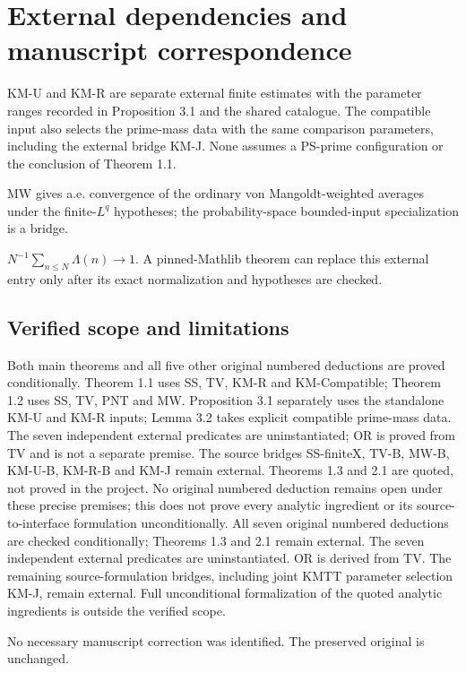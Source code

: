\section*{External dependencies and manuscript correspondence}
\begin{inputthm}\label{input:KM}
KM-U and KM-R are separate external finite estimates with the parameter ranges recorded in Proposition 3.1 and the shared catalogue. The compatible input also selects the prime-mass data with the same comparison parameters, including the external bridge KM-J. None assumes a PS-prime configuration or the conclusion of Theorem 1.1.
\end{inputthm}
\begin{inputthm}\label{input:MW}
MW gives a.e. convergence of the ordinary von Mangoldt-weighted averages under the finite-$L^q$ hypotheses; the probability-space bounded-input specialization is a bridge.
\end{inputthm}
\begin{inputthm}\label{input:PNT}
$N^{-1}\sum_{n\leq N}\Lambda(n)\to1$. A pinned-Mathlib theorem can replace this external entry only after its exact normalization and hypotheses are checked.
\end{inputthm}

\ifDetailed\else\small\fi


\normalsize

\subsection*{Verified scope and limitations}
\ifDetailed
Both main theorems and all five other original numbered deductions are proved conditionally. Theorem 1.1 uses SS, TV, KM-R and KM-Compatible; Theorem 1.2 uses SS, TV, PNT and MW. Proposition 3.1 separately uses the standalone KM-U and KM-R inputs; Lemma 3.2 takes explicit compatible prime-mass data. The seven independent external predicates are uninstantiated; OR is proved from TV and is not a separate premise. The source bridges SS-finiteX, TV-B, MW-B, KM-U-B, KM-R-B and KM-J remain external. Theorems 1.3 and 2.1 are quoted, not proved in the project. No original numbered deduction remains open under these precise premises; this does not prove every analytic ingredient or its source-to-interface formulation unconditionally.
\else
All seven original numbered deductions are checked conditionally; Theorems 1.3 and 2.1 remain external. The seven independent external predicates are uninstantiated. OR is derived from TV. The remaining source-formulation bridges, including joint KMTT parameter selection KM-J, remain external. Full unconditional formalization of the quoted analytic ingredients is outside the verified scope.
\fi

\ifDetailed No necessary manuscript correction was identified. The preserved original is unchanged.\fi
